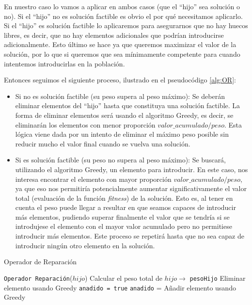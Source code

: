 En nuestro caso lo vamos a aplicar en ambos casos (que el ``hijo'' sea solución o no). 
Si el ``hijo'' no es solución factible es obvio el por qué necesitamos aplicarlo. 
Si el ``hijo'' es solución factible lo aplicaremos para asegurarnos que no hay huecos libres, es decir, que no hay elementos adicionales que podrían introducirse adicionalmente. 
Esto último se hace ya que queremos maximizar el valor de la solución, por lo que si queremos que sea mínimamente competente para cuando intentemos introducirlas en la población. 

Entonces seguimos el siguiente proceso, ilustrado en el pseudocódigo \ref{alg:OR}:
\begin{itemize}
	\item Si no es solución factible (su peso supera al peso máximo): Se deberán eliminar elementos del ``hijo'' hasta que constituya una solución factible. 
La forma de eliminar elementos será usando el algoritmo Greedy, es decir, se eliminarán los elementos con menor proporción $valor\_acumulado/peso$. 
Esta lógica viene dada por un intento de eliminar el máximo peso posible sin reducir mucho el valor final cuando se vuelva una solución. 
	
	\item Si es solución factible (su peso no supera al peso máximo): Se buscará, utilizando el algoritmo Greedy, un elemento para introducir. 
En este caso, nos interesa encontrar el elemento con mayor proporción $valor\_acumulado/peso$, ya que eso nos permitiría potencialmente aumentar significativamente el valor total (evaluación de la función \textit{fitness}) de la solución. 
Esto es, al tener en cuenta el peso puede llegar a resultar en que seamos capaces de introducir más elementos, pudiendo superar finalmente el valor que se tendría si se introdujese el elemento con el mayor valor acumulado pero no permitiese introducir más elementos. 
Este proceso se repetirá hasta que no sea capaz de introducir ningún otro elemento en la solución. 
\end{itemize}


\begin{algorithm}
\caption{Operador de Reparación}\label{alg:OR}
\begin{algorithmic}[1]
\Procedure \texttt{Operador Reparación}($hijo$)
\State Calcular el peso total de $hijo \xrightarrow{}{}$ \texttt{pesoHijo}
		\State Eliminar elemento usando Greedy
	\EndWhile
\Else
	\State \texttt{anadido = true} 
		\State \texttt{anadido} = Añadir elemento usando Greedy
	\EndWhile
\EndIf
\EndProcedure
\end{algorithmic}
\end{algorithm}

